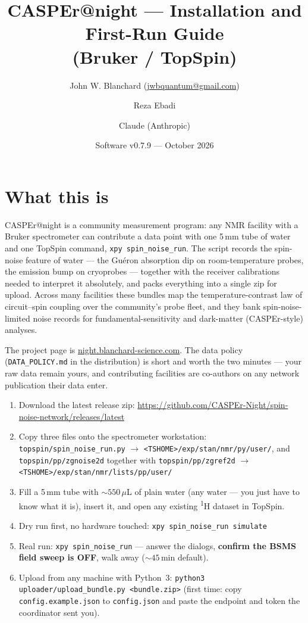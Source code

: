 \documentclass[11pt]{article}
\title{\textbf{CASPEr@night --- Installation and First-Run Guide}\\
\large (Bruker / TopSpin)}
\author{John W. Blanchard (\href{mailto:jwbquantum@gmail.com}{jwbquantum@gmail.com})
\and Reza Ebadi \and Claude (Anthropic)}
\date{Software v0.7.9 --- October 2026}
\newcommand{\hnmr}{\textsuperscript{1}H}
\newcommand{\ts}{TopSpin}
\newcommand{\file}[1]{\texttt{#1}}
\begin{document}
\maketitle

\section{What this is}

CASPEr@night is a community measurement program: any NMR facility with a
Bruker spectrometer can contribute a data point with one 5\,mm tube of water
and one \ts{} command, \texttt{xpy spin\_noise\_run}. The script records the
spin-noise feature of water --- the Gu\'eron absorption dip on room-temperature
probes, the emission bump on cryoprobes --- together with the receiver
calibrations needed to interpret it absolutely, and packs everything into a
single zip for upload. Across many facilities these bundles map the
temperature-contrast law of circuit--spin coupling over the community's probe
fleet, and they bank spin-noise-limited noise records for
fundamental-sensitivity and dark-matter (CASPEr-style) analyses.

The project page is
\href{https://night.blanchard-science.com}{night.blanchard-science.com}. The
data policy (\file{DATA\_POLICY.md} in the distribution) is short and worth the
two minutes --- your raw data remain yours, and contributing facilities are
co-authors on any network publication their data enter.

\begin{tcolorbox}[colback=boxbg, colframe=boxframe,
  title=\textbf{The five-minute version}, fonttitle=\bfseries]
\begin{enumerate}[leftmargin=1.4em]
\item Download the latest release zip:
      \url{https://github.com/CASPEr-Night/spin-noise-network/releases/latest}
\item Copy three files onto the spectrometer workstation:
      \file{topspin/spin\_noise\_run.py} $\rightarrow$
      \file{<TSHOME>/exp/stan/nmr/py/user/}, and
      \file{topspin/pp/zgnoise2d} together with \file{topspin/pp/zgref2d}
      $\rightarrow$ \file{<TSHOME>/exp/stan/nmr/lists/pp/user/}
\item Fill a 5\,mm tube with ${\sim}550\,\mu$L of plain water (any water ---
      you just have to know what it is), insert it, and open any existing
      \hnmr{} dataset in \ts.
\item Dry run first, no hardware touched:
      \texttt{xpy spin\_noise\_run simulate}
\item Real run: \texttt{xpy spin\_noise\_run} --- answer the dialogs,
      \textbf{confirm the BSMS field sweep is OFF}, walk away
      (${\sim}45$\,min default).
\item Upload from any machine with Python~3:
      \texttt{python3 uploader/upload\_bundle.py <bundle.zip>}
      (first time: copy \file{config.example.json} to \file{config.json} and
      paste the endpoint and token the coordinator sent you).
\end{enumerate}
\end{tcolorbox}
\end{document}
